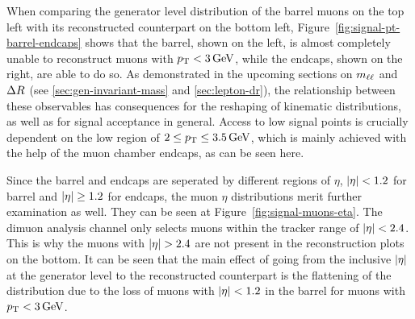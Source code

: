 When comparing the generator level distribution of the barrel muons on the top left with its reconstructed counterpart on the bottom left, Figure~\ref{fig:signal-pt-barrel-endcaps} shows that the barrel, shown on the left, is almost completely unable to reconstruct muons with $p_{\mathrm{T}} < 3\,\text{Ge\hspace{-.08em}V}$, while the endcaps, shown on the right, are able to do so. As demonstrated in the upcoming sections on $m_{\ell\ell}$ and $\Delta R$ (see \ref{sec:gen-invariant-mass} and \ref{sec:lepton-dr}), the relationship between these observables has consequences for the reshaping of kinematic distributions, as well as for signal acceptance in general. Access to low \dm signal points is crucially dependent on the low \pt region of $2 \leq p_{\mathrm{T}} \leq 3.5\,\text{Ge\hspace{-.08em}V}$, which is mainly achieved with the help of the muon chamber endcaps, as can be seen here.

Since the barrel and endcaps are seperated by different regions of $\eta$, $\abs{\eta} < 1.2$ for barrel and $\abs{\eta} \geq 1.2$ for endcaps, the muon $\eta$ distributions merit further examination as well. They can be seen at Figure~\ref{fig:signal-muons-eta}. The dimuon analysis channel only selects muons within the tracker range of $\abs{\eta}<2.4$. This is why the muons with $\abs{\eta}>2.4$ are not present in the reconstruction plots on the bottom. It can be seen that the main effect of going from the inclusive $\abs{\eta}$ at the generator level to the reconstructed counterpart is the flattening of the distribution due to the loss of muons with $\abs{\eta}<1.2$ in the barrel for muons with $p_{\mathrm{T}}<3\,\text{Ge\hspace{-.08em}V}$.

